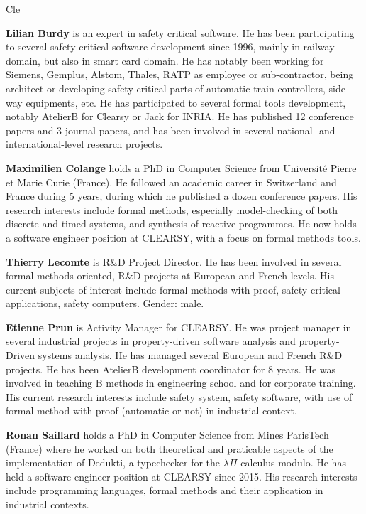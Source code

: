 \begin{sitedescription}{Cle}
\begin{compactitem}
\item\textbf{Lilian Burdy} is an expert in safety critical software. He has been participating to several safety critical software 
development since 1996, mainly in railway domain, but also in smart card domain. He has notably been working for Siemens, Gemplus, 
Alstom, Thales, RATP as employee or sub-contractor, being architect or developing safety critical parts of automatic train controllers, 
side-way equipments, etc. He has participated to several formal tools development, notably AtelierB for Clearsy or Jack for INRIA. He 
has published 12 conference papers and 3 journal papers, and has been involved in several national- and international-level research 
projects.

\item\textbf{Maximilien Colange} holds a PhD in Computer Science from Université Pierre et Marie Curie (France). He followed an 
academic career in Switzerland and France during 5 years, during which he published a dozen conference papers. His research interests
include formal methods, especially model-checking of both discrete and timed systems, and synthesis of reactive programmes. He now holds 
a software engineer position at CLEARSY, with a focus on formal methods tools.

\item\textbf{Thierry Lecomte} is R\&D Project Director. He has been involved in several formal methods oriented, R\&D projects at European 
and French levels. His current subjects of interest include formal methods with proof, safety critical applications, safety computers. 
Gender: male.

\item\textbf{Etienne Prun} is Activity Manager for CLEARSY. He was project manager in several industrial projects in property-driven 
software analysis and property-Driven systems analysis. He has managed several European and French R\&D projects. He has been AtelierB 
development coordinator for 8 years. He was involved in teaching B methods in engineering school and for corporate training. His current 
research interests include safety system, safety software, with use of formal method with proof (automatic or not) in industrial 
context.

\item\textbf{Ronan Saillard} holds a PhD in Computer Science from Mines ParisTech (France) where he worked on both theoretical and praticable 
aspects of the implementation of Dedukti, a typechecker for the $\lambda\Pi$-calculus modulo. He has held a software engineer position at 
CLEARSY since 2015. His research interests include programming languages, formal methods and their application in industrial contexts.
\end{compactitem}

\end{sitedescription}

